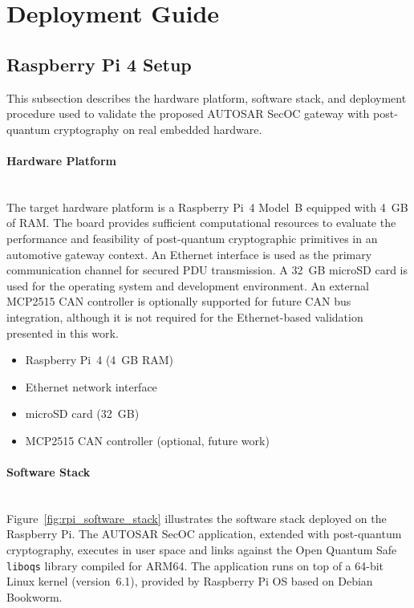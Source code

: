\section{Deployment Guide}
\subsection{Raspberry Pi 4 Setup}
\label{subsec:rpi4_setup}

This subsection describes the hardware platform, software stack, and deployment
procedure used to validate the proposed AUTOSAR SecOC gateway with post-quantum
cryptography on real embedded hardware.

\paragraph{Hardware Platform}
\mbox{}\\
The target hardware platform is a Raspberry Pi~4 Model~B equipped with 4~GB of
RAM. The board provides sufficient computational resources to evaluate the
performance and feasibility of post-quantum cryptographic primitives in an
automotive gateway context. An Ethernet interface is used as the primary
communication channel for secured PDU transmission. A 32~GB microSD card is used
for the operating system and development environment. An external MCP2515 CAN
controller is optionally supported for future CAN bus integration, although it
is not required for the Ethernet-based validation presented in this work.

\begin{itemize}
	\item Raspberry Pi~4 (4~GB RAM)
	\item Ethernet network interface
	\item microSD card (32~GB)
	\item MCP2515 CAN controller (optional, future work)
\end{itemize}

\paragraph{Software Stack}
\mbox{}\\
Figure~\ref{fig:rpi_software_stack} illustrates the software stack deployed on
the Raspberry Pi. The AUTOSAR SecOC application, extended with post-quantum
cryptography, executes in user space and links against the Open Quantum Safe
\texttt{liboqs} library compiled for ARM64. The application runs on top of a
64-bit Linux kernel (version~6.1), provided by Raspberry Pi OS based on Debian
Bookworm.

